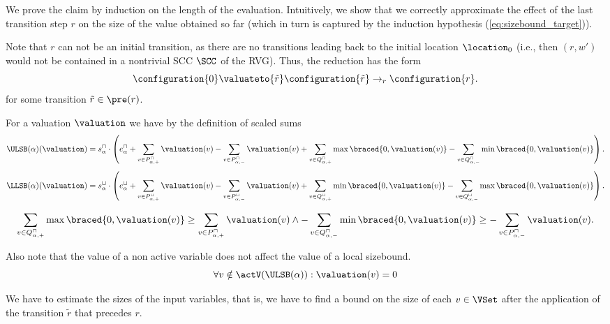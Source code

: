 We prove the claim by induction on the length of the evaluation.
Intuitively, we show that we correctly approximate the effect of the last transition step $r$ on the size of the value obtained so far (which in turn is captured by the induction hypothesis (\ref{eq:sizebound_target})).

Note that $r$ can not be an initial transition, as there are no transitions leading back to the initial location $\location_0$
(i.e., then $(r, w')$ would not be contained in a nontrivial SCC $\SCC$ of the RVG).
Thus, the reduction has the form
\[ \configuration{0} \valuateto{\tilde{r}} \configuration{\tilde{r}} \rightarrow_r \configuration{r}. \]
for some transition $\tilde{r} \in \pre(r)$.

For a valuation $\valuation$ we have by the definition of scaled sums
  \[ \ULSB(\alpha)(\valuation) =
    s^\sqcap_\alpha \cdot \left(
        e^\sqcap_\alpha
      + \sum_{v \in P_{\alpha,+}^\sqcap} \valuation(v)
      - \sum_{v \in P_{\alpha,-}^\sqcap} \valuation(v)
      + \sum_{v \in Q_{\alpha,+}^\sqcap} \max \braced{0,\valuation(v)}
      - \sum_{v \in Q_{\alpha,-}^\sqcap} \min \braced{0,\valuation(v)}
    \right). \]
  \[ \LLSB(\alpha)(\valuation) =
    s^\sqcup_\alpha \cdot \left(
      e^\sqcup_\alpha
    + \sum_{v \in P_{\alpha,+}^\sqcup} \valuation(v)
    - \sum_{v \in P_{\alpha,-}^\sqcup} \valuation(v)
    + \sum_{v \in Q_{\alpha,+}^\sqcup} \min \braced{0,\valuation(v)}
    - \sum_{v \in Q_{\alpha,-}^\sqcup} \max \braced{0,\valuation(v)}
  \right). \]

\begin{equation} \label{eq:maxmineq}
  \sum_{v \in Q_{\alpha,+}^\sqcap} \max \braced{0,\valuation(v)} \geq \sum_{v \in P_{\alpha,+}^\sqcap} \valuation(v) \wedge - \sum_{v \in Q_{\alpha,-}^\sqcap} \min \braced{0,\valuation(v)} \geq - \sum_{v \in P_{\alpha,-}^\sqcap} \valuation(v).
\end{equation}

Also note that the value of a non active variable does not affect the value of a local sizebound.
\begin{equation} \label{eq:nonactiveequalzero}
  \forall v \notin \actV(\ULSB(\alpha)): \valuation(v) = 0
\end{equation}

We have to estimate the sizes of the input variables,
that is, we have to find a bound on the size of each $v \in \VSet$ after the application of the transition $\tilde{r}$ that precedes $r$.

